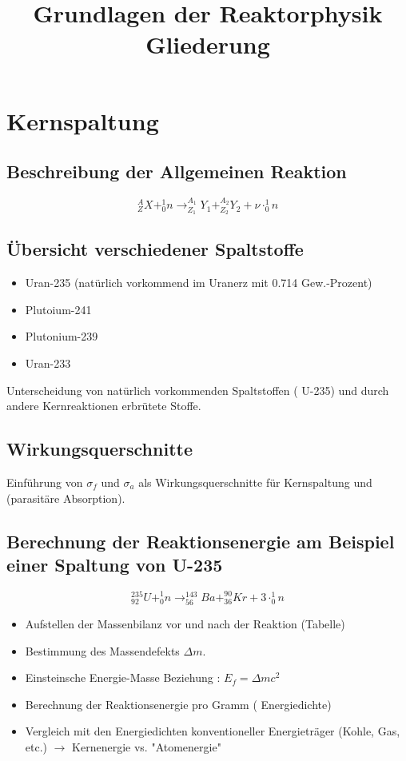 \documentclass[11pt,a4paper]{article}
\title{\textbf{Grundlagen der Reaktorphysik}\\Gliederung}
\date{}
\begin{document}
\maketitle
\section{Kernspaltung}
\subsection{Beschreibung der Allgemeinen Reaktion}
\[
^A_Z X + ^1_0n \rightarrow ^{A_1}_{Z_1}Y_1 +  ^{A_2}_{Z_2}Y_2 + \nu\cdot ^1_0n
\] 
\subsection{Übersicht verschiedener Spaltstoffe}
\begin{itemize}
\item Uran-235 (natürlich vorkommend im Uranerz mit 0.714 Gew.-Prozent)
\item Plutoium-241
\item Plutonium-239
\item Uran-233
 \end{itemize}
Unterscheidung von natürlich vorkommenden Spaltstoffen ( U-235) und durch andere Kernreaktionen erbrütete Stoffe.
\subsection{Wirkungsquerschnitte}
Einführung von $\sigma_f$ und $\sigma_a$ als Wirkungsquerschnitte für Kernspaltung und (parasitäre Absorption). 

\subsection{Berechnung der Reaktionsenergie am Beispiel einer Spaltung von U-235}
\[
^{235}_{92} U + ^1_0n \rightarrow ^{143}_{56}Ba +  ^{90}_{36}Kr + 3 \cdot ^1_0n
\]
\begin{itemize}
\item Aufstellen der Massenbilanz vor und nach der Reaktion (Tabelle)
\item Bestimmung des Massendefekts $\Delta m$.
\item Einsteinsche Energie-Masse Beziehung : $E_f = \Delta m c^2$
\item Berechnung der Reaktionsenergie pro Gramm ( Energiedichte)
\item Vergleich mit den Energiedichten konventioneller Energieträger (Kohle, Gas, etc.) 
$\rightarrow $ Kernenergie vs. "Atomenergie"
\end{itemize}
\end{document}
